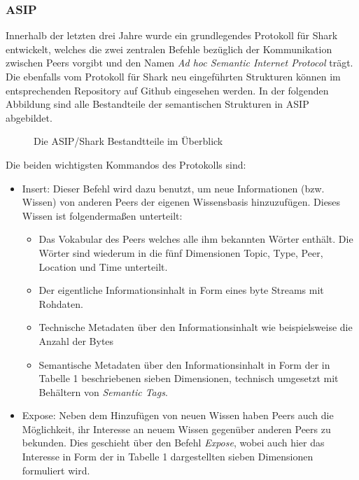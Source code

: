 \subsubsection{ASIP}
Innerhalb der letzten drei Jahre wurde ein grundlegendes Protokoll für Shark entwickelt, welches die zwei zentralen Befehle bezüglich der Kommunikation zwischen Peers vorgibt und den Namen \textit{Ad hoc Semantic Internet Protocol} trägt. Die ebenfalls vom Protokoll für Shark neu eingeführten Strukturen können im entsprechenden Repository auf Github eingesehen werden. In der folgenden Abbildung sind alle Bestandteile der semantischen Strukturen in ASIP abgebildet.
\begin{figure}[H]
	\centering
	\hspace*{1cm}
	\caption{Die ASIP/Shark Bestandtteile im Überblick}
	\label{fig:knowledge}
\end{figure}
Die beiden wichtigsten Kommandos des Protokolls sind:
\begin{itemize}
	\item Insert: Dieser Befehl wird dazu benutzt, um neue Informationen (bzw. Wissen) von anderen Peers der eigenen Wissensbasis hinzuzufügen. Dieses Wissen ist folgendermaßen unterteilt:
	\begin{itemize}
		\item Das Vokabular des Peers welches alle ihm bekannten Wörter enthält. Die Wörter sind wiederum in die fünf Dimensionen Topic, Type, Peer, Location und Time unterteilt.
		\item Der eigentliche Informationsinhalt in Form eines byte Streams mit Rohdaten.
		\item Technische Metadaten über den Informationsinhalt wie beispielsweise die Anzahl der Bytes
		\item Semantische Metadaten über den Informationsinhalt in Form der in Tabelle 1 beschriebenen sieben Dimensionen, technisch umgesetzt mit Behältern von \textit{Semantic Tags}.		
	\end{itemize} 
	\item Expose: Neben dem Hinzufügen von neuen Wissen haben Peers auch die Möglichkeit, ihr Interesse an neuem Wissen gegenüber anderen Peers zu bekunden. Dies geschieht über den Befehl \textit{Expose}, wobei auch hier das Interesse in Form der in Tabelle 1 dargestellten sieben Dimensionen formuliert wird.
\end{itemize}
